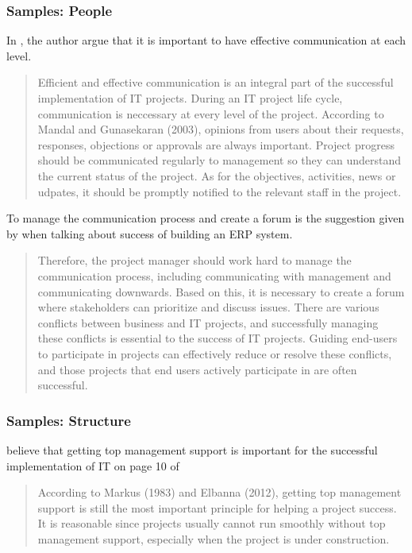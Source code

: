 \subsubsection{Samples: People}
In , the author argue that it is important to have effective communication at each level.

\begin{quotation}
Efficient and effective communication is an integral part of the successful implementation of IT projects. During an IT project life cycle, communication is neccessary at every level of the project. According to Mandal and Gunasekaran (2003), opinions from users about their requests, responses, objections or approvals are always important. Project progress should be communicated regularly to management so they can understand the current status of the project. As for the objectives, activities, news or udpates, it should be promptly notified to the relevant staff in the project.
\end{quotation}


To manage the communication process and create a forum is the suggestion given by \citeauthor{2} when talking about success of building an ERP system.

\begin{quotation}
Therefore, the project manager should work hard to manage the communication process, including communicating with management and communicating downwards. Based on this, it is necessary to create a forum where stakeholders can prioritize and discuss issues. There are various conflicts between business and IT projects, and successfully managing these conflicts is essential to the success of IT projects. Guiding end-users to participate in projects can effectively reduce or resolve these conflicts, and those projects that end users actively participate in are often successful.
\end{quotation}

\subsubsection{Samples: Structure}
\citeauthor{6} believe that getting top management support is important for the successful implementation of IT on page 10 of 

\begin{quotation}
According to Markus (1983) and Elbanna (2012), getting top management support is still the most important principle for helping a project success. It is reasonable since projects usually cannot run smoothly without top management support, especially when the project is under construction.
\end{quotation}

